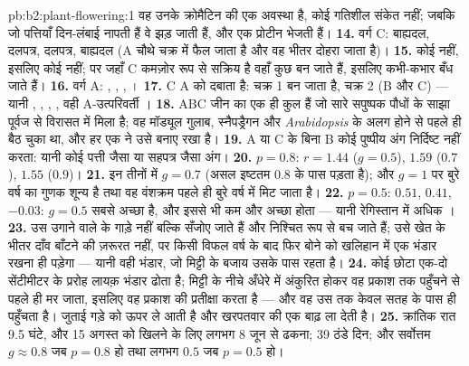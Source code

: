 \begin{solution}{pb:b2:plant-flowering:1}
वह उनके क्रोमैटिन की एक अवस्था है, कोई गतिशील संकेत नहीं; जबकि जो
पत्तियाँ दिन-लंबाई नापती हैं वे झड़ जाती हैं, और एक प्रोटीन भेजती हैं।
\textbf{14.} वर्ग C: बाह्यदल, दलपत्र, दलपत्र, बाह्यदल (A चौथे चक्र में
फैल जाता है और वह  भीतर दोहरा जाता है)।
\textbf{15.} कोई  नहीं, इसलिए कोई  नहीं; पर जहाँ C
कमज़ोर रूप से सक्रिय है वहाँ कुछ  बन जाते हैं, इसलिए कभी-कभार  बँध जाते हैं।
\textbf{16.} वर्ग A: , , , ।
\textbf{17.} C A को दबाता है: चक्र 1  बन जाता है, चक्र 2 (B और C)
 --- यानी , , , , वही A-उत्परिवर्ती ।
\textbf{18.} ABC जीन  का एक ही कुल हैं
जो सारे सपुष्पक पौधों के साझा पूर्वज से विरासत में मिला है; वह
मॉड्यूल गुलाब, स्नैपड्रैगन और \emph{Arabidopsis} के अलग होने से पहले ही
बैठ चुका था, और हर एक ने उसे बनाए रखा है।
\textbf{19.} A या C के बिना B कोई पुष्पीय अंग निर्दिष्ट नहीं करता:
यानी कोई पत्ती जैसा या सहपत्र जैसा अंग।
\textbf{20.} $p = 0.8$: $r = 1.44$ ($g = 0.5$), $1.59$ ($0.7$), $1.55$
($0.9$)।
\textbf{21.} इन तीनों में $g = 0.7$ (असल इष्टतम
$0.8$ के पास पड़ता है); और $g = 1$ पर बुरे वर्ष का गुणक शून्य है तथा वह
वंशक्रम पहले ही बुरे वर्ष में मिट जाता है।
\textbf{22.} $p = 0.5$: $0.51$, $0.41$, $-0.03$: $g = 0.5$ सबसे अच्छा
है, और इससे भी कम और अच्छा होता --- यानी रेगिस्तान में अधिक ।
\textbf{23.} उस उगाने वाले के  गाड़े नहीं बल्कि सँजोए जाते हैं और
निश्चित रूप से बच जाते हैं; उसे खेत के भीतर दाँव बाँटने की ज़रूरत नहीं,
पर किसी विफल वर्ष के बाद फिर बोने को खलिहान में एक भंडार रखना ही पड़ेगा
--- यानी वही भंडार, जो मिट्टी के बजाय उसके पास रहता है।
\textbf{24.} कोई छोटा  एक-दो सेंटीमीटर के प्ररोह लायक़ भंडार ढोता
है; मिट्टी के नीचे अँधेरे में अंकुरित होकर वह प्रकाश तक पहुँचने से पहले
ही मर जाता, इसलिए वह प्रकाश की प्रतीक्षा करता है --- और वह उस तक
केवल सतह के पास ही पहुँचता है। जुताई गड़े  को ऊपर ले आती है और
खरपतवार की एक बाढ़ ला देती है।
\textbf{25.} क्रांतिक रात 9.5 घंटे, और 15 अगस्त को खिलने के लिए लगभग
8 जून से ढकना; 39 ठंडे दिन; और सर्वोत्तम $g \approx 0.8$ जब $p = 0.8$
हो तथा लगभग $0.5$ जब $p = 0.5$ हो।
\end{solution}
